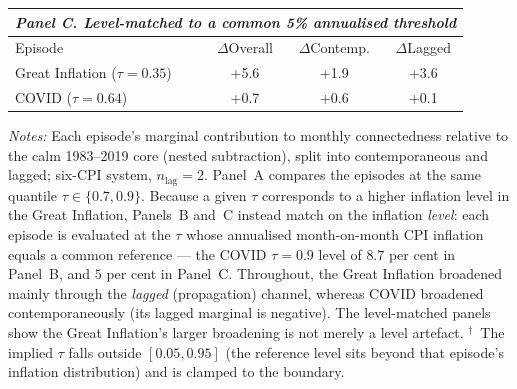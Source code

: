 \begin{table}[!ht]
\begin{threeparttable}
\vspace{4pt}
\begin{tabular}{l c c c}
\multicolumn{4}{l}{\textit{Panel C. Level-matched to a common 5\% annualised threshold}}\\
\toprule
Episode & $\Delta$Overall & $\Delta$Contemp. & $\Delta$Lagged \\
\midrule
Great Inflation ($\tau=0.35$) & +5.6 & +1.9 & +3.6 \\
COVID ($\tau=0.64$) & +0.7 & +0.6 & +0.1 \\
\bottomrule
\end{tabular}
\begin{tablenotes}[flushleft]\footnotesize
\item \textit{Notes:} Each episode's marginal contribution to monthly connectedness relative to the calm 1983--2019 core (nested subtraction), split into contemporaneous and lagged; six-CPI system, $n_{\text{lag}}=2$. Panel~A compares the episodes at the same quantile $\tau\in\{0.7,0.9\}$. Because a given $\tau$ corresponds to a higher inflation level in the Great Inflation, Panels~B and~C instead match on the inflation \emph{level}: each episode is evaluated at the $\tau$ whose annualised month-on-month CPI inflation equals a common reference --- the COVID $\tau=0.9$ level of $8.7$ per cent in Panel~B, and $5$ per cent in Panel~C. Throughout, the Great Inflation broadened mainly through the \emph{lagged} (propagation) channel, whereas COVID broadened contemporaneously (its lagged marginal is negative). The level-matched panels show the Great Inflation's larger broadening is not merely a level artefact. $^{\dagger}$~The implied $\tau$ falls outside $[0.05,0.95]$ (the reference level sits beyond that episode's inflation distribution) and is clamped to the boundary.
\end{tablenotes}
\end{threeparttable}
\end{table}

